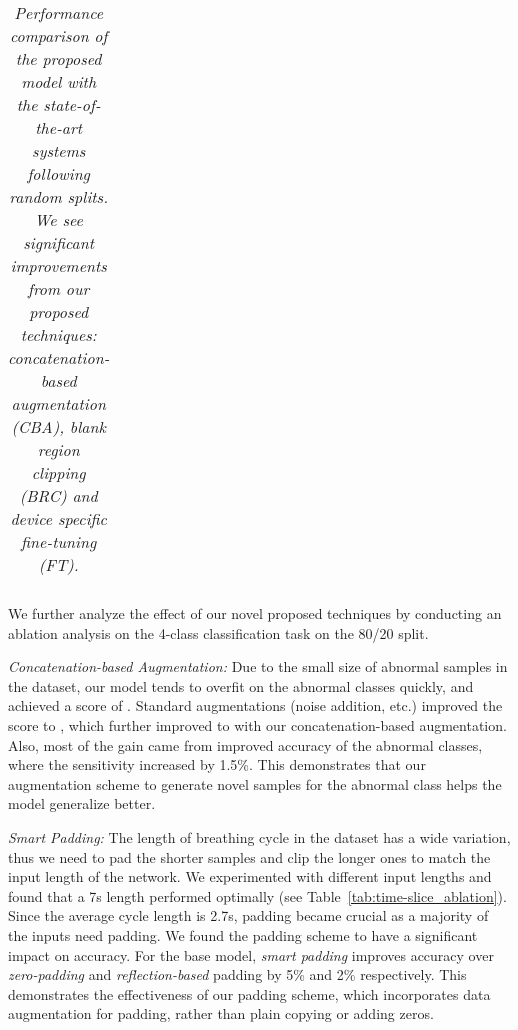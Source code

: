 \documentclass{article}
\begin{document}
\begin{table}[t]
{\begin{tabular}{ c | c | c c c}
 \bottomrule
\end{tabular}
 }
\vspace{-2mm}
\caption{\textit{Performance comparison of the proposed model with the state-of-the-art systems following random splits. We see significant improvements from our proposed techniques: concatenation-based augmentation (CBA), blank region clipping (BRC) and device specific fine-tuning (FT).}}
\label{tab:result_comparison}
\end{table}  We further analyze the effect of our novel proposed techniques by conducting an ablation analysis on the 4-class classification task on the 80/20 split.

\smallskip\noindent\textit{Concatenation-based Augmentation:}
Due to the small size of abnormal samples in the dataset, our model tends to overfit on the abnormal classes quickly, and achieved a score of . Standard augmentations (noise addition, etc.) improved the score to , which further improved to  with our concatenation-based augmentation. Also, most of the gain came from improved accuracy of the abnormal classes, where the sensitivity increased by 1.5\%. This demonstrates that our augmentation scheme to generate novel samples for the abnormal class helps the model generalize better.


\begin{table}[t]
\centering
\vspace{-2mm}
\caption{\textit{Input length size  vs classification score.}}
\vspace*{-12pt}
\label{tab:time-slice_ablation}
\end{table} \smallskip\noindent\textit{Smart Padding:} The length of breathing cycle in the dataset has a wide variation, thus we need to pad the shorter samples and clip the longer ones to match the input length of the network. We experimented with different input lengths and found that a 7s length performed optimally (see Table~\ref{tab:time-slice_ablation}). Since the average cycle length is 2.7s, padding became crucial as a majority of the inputs need padding. We found the padding scheme to have a significant impact on accuracy. For the base model, \textit{smart padding} improves accuracy over \textit{zero-padding} and \textit{reflection-based} padding by 5\% and 2\% respectively. This demonstrates the effectiveness of our padding scheme, which incorporates data augmentation for padding, rather than plain copying or adding zeros.
\end{document}
